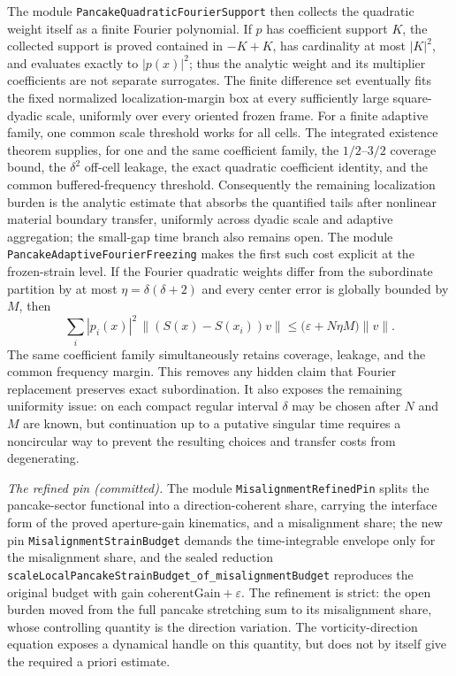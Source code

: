 \documentclass[11pt]{article}
\theoremstyle{definition}
\begin{document}
The module \texttt{PancakeQuadraticFourierSupport} then collects the quadratic
weight itself as a finite Fourier polynomial.  If $p$ has coefficient support
$K$, the collected support is proved contained in
$-K+K$, has cardinality at most $|K|^2$, and evaluates exactly to $|p(x)|^2$;
thus the analytic weight and its multiplier coefficients are not separate
surrogates.  The finite difference set eventually fits the fixed normalized
localization-margin box at every sufficiently large square-dyadic scale,
uniformly over every oriented frozen frame.  For a finite adaptive family,
one common scale threshold works for all cells.  The integrated existence
theorem supplies, for one and the same coefficient family, the $1/2$--$3/2$
coverage bound, the $\delta^2$ off-cell leakage, the exact quadratic
coefficient identity, and the common buffered-frequency threshold.
Consequently the remaining localization burden is the analytic estimate
that absorbs the quantified tails after nonlinear material boundary transfer,
uniformly across dyadic scale and adaptive aggregation; the small-gap time
branch also remains open.
The module \texttt{PancakeAdaptiveFourierFreezing} makes the first such cost
explicit at the frozen-strain level.  If the Fourier quadratic weights differ
from the subordinate partition by at most
$\eta=\delta(\delta+2)$ and every center error is globally bounded by $M$,
then
\[
 \sum_i |p_i(x)|^2\,\|(S(x)-S(x_i))v\|
 \leq \bigl(\varepsilon+N\eta M\bigr)\|v\|.
\]
The same coefficient family simultaneously retains coverage, leakage, and
the common frequency margin.  This removes any hidden claim that Fourier
replacement preserves exact subordination.  It also exposes the remaining
uniformity issue: on each compact regular interval $\delta$ may be chosen
after $N$ and $M$ are known, but continuation up to a putative singular time
requires a noncircular way to prevent the resulting choices and transfer
costs from degenerating.

\emph{The refined pin (committed).}  The module
\texttt{MisalignmentRefinedPin} splits the pancake-sector functional
into a direction-coherent share, carrying the interface form of the
proved aperture-gain kinematics, and a misalignment share; the new pin
\texttt{MisalignmentStrainBudget} demands the time-integrable envelope
only for the misalignment share, and the sealed reduction
\texttt{scaleLocalPancakeStrainBudget\_of\_misalignmentBudget}
reproduces the original budget with gain
$\mathrm{coherentGain} + \varepsilon$.  The refinement is strict: the
open burden moved from the full pancake stretching sum to its
misalignment share, whose controlling quantity is the direction
variation.  The vorticity-direction equation exposes a dynamical handle on
this quantity, but does not by itself give the required a priori estimate.
\end{document}
